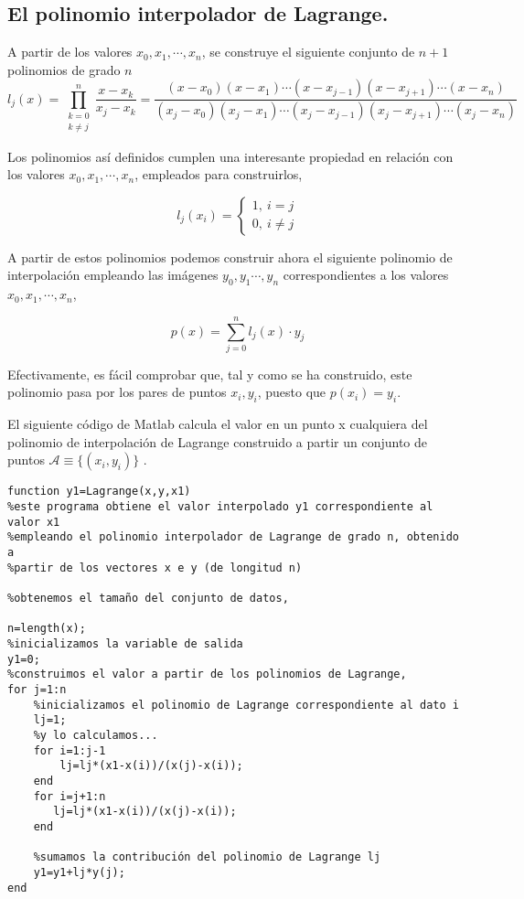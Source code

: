 \subsection{El polinomio interpolador de Lagrange.} \label{sec:lagranje} 

A partir de los valores $x_0, x_1,\cdots, x_n$, se construye el siguiente conjunto de $n+1$ polinomios de grado $n$
\begin{equation*}
l_j(x)=\prod_{\substack{k=0\\
k\neq j}}^n\frac{x-x_k}{x_j-x_k}=\frac{(x-x_0)(x-x_1)\cdots(x-x_{j-1})(x-x_{j+1})\cdots(x-x_n)}{(x_j-x_0)(x_j-x_1)\cdots(x_j-x_{j-1})(x_j-x_{j+1})\cdots(x_j-x_n)}
\end{equation*}

Los polinomios así definidos cumplen una interesante propiedad en  relación con los valores $x_0, x_1,\cdots, x_n$, empleados para construirlos,

\begin{equation*}
l_j(x_i)= \left\{ 
\begin{aligned}
1,\ i=j\\
0,\ i\neq j
\end{aligned}
\right.
\end{equation*}

A partir de estos polinomios podemos construir ahora el siguiente polinomio de interpolación empleando las imágenes $y_0,y_1\cdots, y_n$ correspondientes a los valores $x_0, x_1,\cdots, x_n$,

\begin{equation*}
p(x)=\sum_{j=0}^n l_j(x)\cdot y_j
\end{equation*}

Efectivamente, es fácil comprobar que, tal y como se ha construido, este polinomio pasa por los pares de puntos $x_i,y_i$, puesto que $p(x_i)=y_i$.

El siguiente código de Matlab calcula el valor en un punto x cualquiera del polinomio de interpolación de Lagrange construido a partir un conjunto de puntos $\mathcal{A}\equiv \{(x_i,y_i)\}$ . 

\begin{verbatim}
function y1=Lagrange(x,y,x1)
%este programa obtiene el valor interpolado y1 correspondiente al valor x1
%empleando el polinomio interpolador de Lagrange de grado n, obtenido a 
%partir de los vectores x e y (de longitud n)

%obtenemos el tamaño del conjunto de datos,

n=length(x);
%inicializamos la variable de salida
y1=0;
%construimos el valor a partir de los polinomios de Lagrange,
for j=1:n
    %inicializamos el polinomio de Lagrange correspondiente al dato i
    lj=1;
    %y lo calculamos...
    for i=1:j-1
        lj=lj*(x1-x(i))/(x(j)-x(i));
    end
    for i=j+1:n
       lj=lj*(x1-x(i))/(x(j)-x(i));
    end 
    
    %sumamos la contribución del polinomio de Lagrange lj
    y1=y1+lj*y(j);
end
\end{verbatim}

